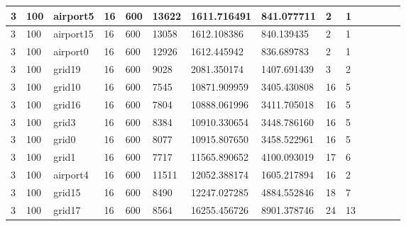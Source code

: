 \documentclass[../thesis.tex]{subfiles}
\begin{document}
\begin{table}[!ht]
\begin{tabularx}{\textwidth}{|X|X|X|X|X|X|X|X|X|X|X|X|X|X|}
        3 & 100 & airport5 & 16 & 600 & 13622 & 1611.716491 & 841.077711 & 2 & 1 \\ \hline
        3 & 100 & airport15 & 16 & 600 & 13058 & 1612.108386 & 840.139435 & 2 & 1 \\ \hline
        3 & 100 & airport0 & 16 & 600 & 12926 & 1612.445942 & 836.689783 & 2 & 1 \\ \hline
        3 & 100 & grid19 & 16 & 600 & 9028 & 2081.350174 & 1407.691439 & 3 & 2 \\ \hline
        3 & 100 & grid10 & 16 & 600 & 7545 & 10871.909959 & 3405.430808 & 16 & 5 \\ \hline
        3 & 100 & grid16 & 16 & 600 & 7804 & 10888.061996 & 3411.705018 & 16 & 5 \\ \hline
        3 & 100 & grid3 & 16 & 600 & 8384 & 10910.330654 & 3448.786160 & 16 & 5 \\ \hline
        3 & 100 & grid0 & 16 & 600 & 8077 & 10915.807650 & 3458.522961 & 16 & 5 \\ \hline
        3 & 100 & grid1 & 16 & 600 & 7717 & 11565.890652 & 4100.093019 & 17 & 6 \\ \hline
        3 & 100 & airport4 & 16 & 600 & 11511 & 12052.388174 & 1605.217894 & 16 & 2 \\ \hline
        3 & 100 & grid15 & 16 & 600 & 8490 & 12247.027285 & 4884.552846 & 18 & 7 \\ \hline
        3 & 100 & grid17 & 16 & 600 & 8564 & 16255.456726 & 8901.378746 & 24 & 13 \\ \hline
    \end{tabularx}
    \end{table}
    
\end{document}
